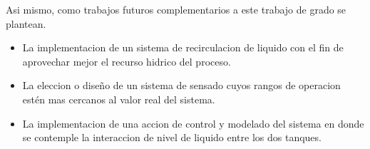 \documentclass[a4paper,12pt,twoside]{proyectotanquesecci}
\begin{document}
Asi mismo, como trabajos futuros complementarios a este trabajo de grado se plantean. \\

\begin{itemize}
\item La implementacion de un sistema de recirculacion de liquido con el fin de aprovechar mejor el recurso hidrico del proceso.
\item La eleccion o diseño de un sistema de sensado cuyos rangos de operacion estén mas cercanos al valor real del sistema.
\item La implementacion de una accion de control y modelado del sistema en donde se contemple la interaccion de nivel de liquido entre los dos tanques.
\end{itemize}

































%
%
\end{document}
